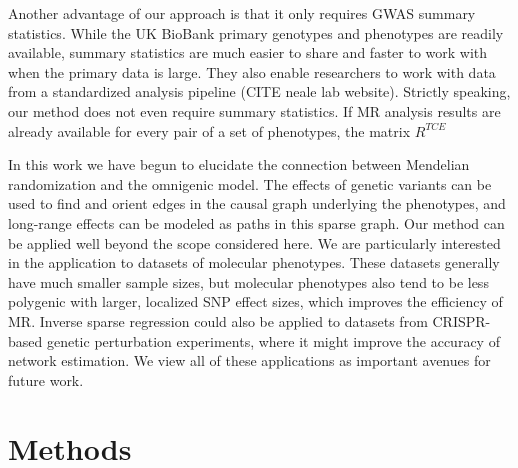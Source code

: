 \documentclass{article}
\begin{document}
Another advantage of our approach is that it only requires GWAS summary statistics.
While the UK BioBank primary genotypes and phenotypes are readily available, summary
statistics are much easier to share and faster to work with when the primary
data is large. They also enable researchers to work with data from a standardized
analysis pipeline (CITE neale lab website).
Strictly speaking, our method does not even require summary statistics. If
MR analysis results are already available for every pair of a set of phenotypes,
the matrix $R^{TCE}$ 

In this work we have begun to elucidate the connection between Mendelian randomization
and the omnigenic model. The effects of genetic variants can be used to find and orient edges
in the causal graph underlying the phenotypes, and long-range effects can be modeled
as paths in this sparse graph. Our method can be applied well beyond the scope considered
here. We are particularly interested in the application to datasets of molecular phenotypes.
These datasets generally have much smaller sample sizes, but molecular phenotypes also
tend to be less polygenic with larger, localized SNP effect sizes, which improves the efficiency
of MR. Inverse sparse regression could also be applied to datasets from CRISPR-based
genetic perturbation experiments, where it might improve the accuracy of network estimation.
We view all of these applications as important avenues for future work. 

\section{Methods}\label{methods}
\end{document}
